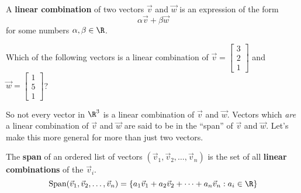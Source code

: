 \documentclass{ximera}
\begin{document}
\begin{question}
  A \textbf{linear combination} of two vectors $\vec{v}$ and $\vec{w}$ is an expression of the form
  $$
  \alpha \vec{v} + \beta \vec{w}
  $$
  for some numbers $\alpha, \beta \in \R$.
  
  Which of the following vectors is a linear combination of $\vec{v} = \begin{bmatrix} 3 \\ 2 \\ 1 \end{bmatrix}$ and $\vec{w} = \begin{bmatrix} 1 \\ 5 \\ 1\end{bmatrix}$?
    
  \begin{solution}
    \begin{multiple-choice}
    \end{multiple-choice}
  \end{solution}

  So not every vector in $\R^3$ is a linear combination of $\vec{v}$
  and $\vec{w}$.  Vectors which \textit{are} a linear combination of
  $\vec{v}$ and $\vec{w}$ are said to be in the ``span'' of $\vec{v}$
  and $\vec{w}$.  Let's make this more general for more than just two
  vectors.

  \begin{definition}
    The \textbf{span} of an ordered list of vectors $(\vec{v}_1,\vec{v}_2, \ldots,\vec{v}_n)$ is the set of all \textbf{linear combinations} of the $\vec{v}_i$.
    \[\textrm{Span}(\vec{v}_1,\vec{v}_2, \ldots,\vec{v}_n) = \{a_1\vec{v}_1+a_2\vec{v}_2+ \cdots +a_n\vec{v}_n: a_i \in \R\}\]
  \end{definition}
\end{question}

 
 
\end{document}

